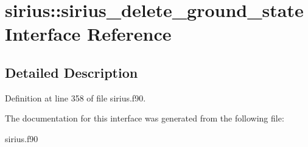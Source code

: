 \hypertarget{interfacesirius_1_1sirius__delete__ground__state}{}\section{sirius\+:\+:sirius\+\_\+delete\+\_\+ground\+\_\+state Interface Reference}
\label{interfacesirius_1_1sirius__delete__ground__state}


\subsection{Detailed Description}


Definition at line 358 of file sirius.\+f90.



The documentation for this interface was generated from the following file\+:\begin{DoxyCompactItemize}
\item 
sirius.\+f90\end{DoxyCompactItemize}
